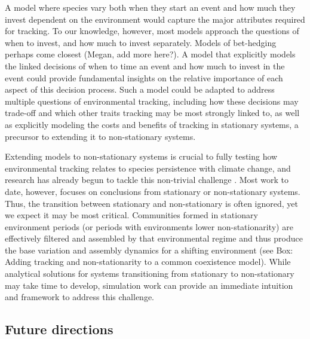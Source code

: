 \documentclass[11pt,letterpaper]{article}
\begin{document}
A model where species vary both when they start an event and how much they invest dependent on the environment would capture the major attributes required for tracking. To our knowledge, however, most models approach the questions of when to invest, and how much to invest separately. Models of bet-hedging perhaps come closest \citep{Gourbiere2009,tufto2015}(Megan, add more here?). A model that explicitly models the linked decisions of when to time an event and how much to invest in the event could provide fundamental insights on the relative importance of each aspect of this decision process. Such a model could be adapted to address multiple questions of environmental tracking, including how these decisions may trade-off and which other traits tracking may be most strongly linked to, as well as explicitly modeling the costs and benefits of tracking in stationary systems, a precursor to extending it to non-stationary systems. 

Extending models to non-stationary systems is crucial to fully testing how environmental tracking relates to species persistence with climate change, and research has already begun to tackle this non-trivial challenge \citep{chessonnonstat,legault2019,volkerass}. Most work to date, however, focuses on conclusions from stationary or non-stationary systems. Thus, the transition between stationary and non-stationary is often ignored, yet we expect it may be most critical. Communities formed in stationary environment periods (or periods with environments lower non-stationarity) are effectively filtered and assembled by that environmental regime and thus produce the base variation and assembly dynamics for a shifting environment  (see Box: Adding tracking and non-stationarity to a common coexistence model). While analytical solutions for systems transitioning from stationary to non-stationary may take time to develop, simulation work can provide an immediate intuition and framework to address this challenge. 

\subsection{Future directions}
\end{document}
